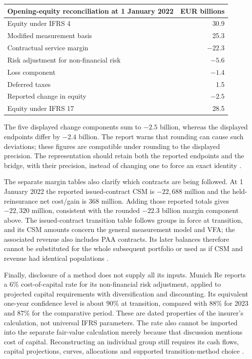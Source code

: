 \begin{center}
\begin{tabular}{lr}
\toprule
Opening-equity reconciliation at 1 January 2022 & EUR billions \\
\midrule
Equity under IFRS 4 & 30.9 \\
Modified measurement basis & 25.3 \\
Contractual service margin & $-22.3$ \\
Risk adjustment for non-financial risk & $-5.6$ \\
Loss component & $-1.4$ \\
Deferred taxes & 1.5 \\
Reported change in equity & $-2.5$ \\
Equity under IFRS 17 & 28.5 \\
\bottomrule
\end{tabular}
\end{center}

The five displayed change components sum to $-2.5$ billion, whereas the
displayed endpoints differ by $-2.4$ billion. The report warns that rounding
can cause such deviations; these figures are compatible under rounding to
the displayed precision. The representation should retain both the reported
endpoints and the bridge, with their precision, instead of changing one to
force an exact identity \citep[pp.~1, 155 and 184]{munichre2023annual}.

\clearpage
The separate margin tables also clarify which contracts are being followed.
At 1 January 2022 the reported issued-contract CSM is $-22{,}688$ million
and the held-reinsurance net cost/gain is $368$ million. Adding those reported
totals gives $-22{,}320$ million, consistent with the rounded $-22.3$ billion
margin component above. The issued-contract transition table follows groups
in force at transition, and its CSM amounts concern the general measurement
model and VFA; the associated revenue also includes PAA contracts. Its
later balances therefore cannot be substituted for the whole subsequent
portfolio or used as if CSM and revenue had identical populations
\citep[pp.~210--211 and 254--255]{munichre2023annual}.

Finally, disclosure of a method does not supply all its inputs. Munich Re
reports a 6\% cost-of-capital rate for its non-financial risk adjustment,
applied to projected capital requirements with diversification and discounting.
Its equivalent one-year confidence level is about 90\% at transition, compared
with 88\% for 2023 and 87\% for the comparative period. These are dated
properties of the insurer's calculation, not universal IFRS parameters.
The rate also cannot be imported into the separate fair-value calculation
merely because that discussion mentions cost of capital. Reconstructing an
individual group still requires its cash flows, capital projections, curves,
allocations and supported transition-method choice
\citep[pp.~165, 183 and 185]{munichre2023annual}.

